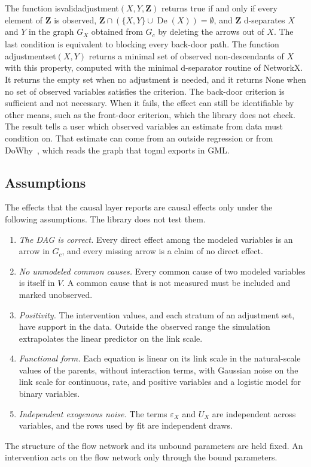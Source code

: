 \documentclass[12pt]{article}
\DeclareMathOperator{\De}{De}
\newcommand{\code}[1]{{\ttfamily\def\_{\textunderscore\allowbreak}#1}}
\theoremstyle{plain}
\theoremstyle{definition}
\begin{document}
The function \code{is\_valid\_adjustment}$(X,Y,\mathbf{Z})$ returns true if and only if every element of $\mathbf{Z}$ is observed, $\mathbf{Z}\cap(\{X,Y\}\cup\De(X))=\emptyset$, and $\mathbf{Z}$ d-separates $X$ and $Y$ in the graph $G_{\underline{X}}$ obtained from $G_c$ by deleting the arrows out of $X$. The last condition is equivalent to blocking every back-door path. The function \code{adjustment\_set}$(X,Y)$ returns a minimal set of observed non-descendants of $X$ with this property, computed with the minimal d-separator routine of NetworkX. It returns the empty set when no adjustment is needed, and it returns \code{None} when no set of observed variables satisfies the criterion. The back-door criterion is sufficient and not necessary. When it fails, the effect can still be identifiable by other means, such as the front-door criterion, which the library does not check. The result tells a user which observed variables an estimate from data must condition on. That estimate can come from an outside regression or from DoWhy~\cite{sharma2020dowhy}, which reads the graph that \code{to\_gml} exports in GML.

\subsection{Assumptions}\label{sec:assumptions}

The effects that the causal layer reports are causal effects only under the following assumptions. The library does not test them.
\begin{enumerate}[label=(A\arabic*), leftmargin=*]
    \item \emph{The DAG is correct.} Every direct effect among the modeled variables is an arrow in $G_c$, and every missing arrow is a claim of no direct effect.
    \item \emph{No unmodeled common causes.} Every common cause of two modeled variables is itself in $V$. A common cause that is not measured must be included and marked unobserved.
    \item \emph{Positivity.} The intervention values, and each stratum of an adjustment set, have support in the data. Outside the observed range the simulation extrapolates the linear predictor on the link scale.
    \item \emph{Functional form.} Each equation is linear on its link scale in the natural-scale values of the parents, without interaction terms, with Gaussian noise on the link scale for continuous, rate, and positive variables and a logistic model for binary variables.
    \item \emph{Independent exogenous noise.} The terms $\varepsilon_X$ and $U_X$ are independent across variables, and the rows used by \code{fit} are independent draws.
\end{enumerate}
The structure of the flow network and its unbound parameters are held fixed. An intervention acts on the flow network only through the bound parameters.
\end{document}
